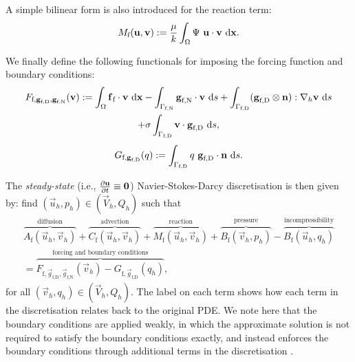             A simple bilinear form is also introduced for the reaction term:
            \begin{equation}
                M_\text{f}(\boldsymbol{\mathbf{u}}, \boldsymbol{\mathbf{v}}) := \frac{\mu}{k} \int_\Omega \Psi ~ \boldsymbol{\mathbf{u}} \cdot \boldsymbol{\mathbf{v}} ~\mathrm{d} \boldsymbol{\mathbf{x}}.
            \end{equation}
    
            We finally define the following functionals for imposing the forcing function and boundary conditions:
            \begin{multline}
                    F_{\text{f},\boldsymbol{\mathbf{g}}_\text{f,D}, \boldsymbol{\mathbf{g}}_\text{f,N}}(\boldsymbol{\mathbf{v}}) := \int_{\Omega} \boldsymbol{\mathbf{f}}_\text{f} \cdot \boldsymbol{\mathbf{v}} ~\mathrm{d}\boldsymbol{\mathbf{x}} - \int_{\Gamma_\text{f,N}} \boldsymbol{\mathbf{g}}_\text{f,N}  \cdot\boldsymbol{\mathbf{v}} ~\mathrm{d} s + \int_{\Gamma_\text{f,D}} (\boldsymbol{\mathbf{g}}_\text{f,D} \otimes \boldsymbol{\mathbf{n}}) : \nabla_h \boldsymbol{\mathbf{v}} ~\mathrm{d} s \\ + \sigma\int_{\Gamma_\text{f,D}} \boldsymbol{\mathbf{v}} \cdot \boldsymbol{\mathbf{g}}_\text{f,D} ~\mathrm{d} s,
            \end{multline}
            \begin{equation}
                    G_{\text{f},\boldsymbol{\mathbf{g}}_\text{f,D}}(q) := \int_{\Gamma_\text{f,D}} q ~ \boldsymbol{\mathbf{g}}_\text{f,D} \cdot \boldsymbol{\mathbf{n}} ~\mathrm{d} s.
            \end{equation}

            The \textit{steady-state} (i.e., $\pdv{\boldsymbol{\mathbf{u}}}{t} \equiv \boldsymbol{\mathbf{0}}$) Navier-Stokes-Darcy discretisation is then given by: find $(\vec{u}_h, p_h) \in (\vec{V}_h, Q_h)$ such that
            \begin{multline}
                \overbrace{A_\text{f}(\vec{u}_h, \vec{v}_h)}^{\text{diffusion}} + \overbrace{C_\text{f}(\vec{u}_h, \vec{v}_h)}^{\text{advection}} + \overbrace{M_\text{f}(\vec{u}_h, \vec{v}_h)}^{\text{reaction}} + \overbrace{B_\text{f}(\vec{v}_h, p_h)}^{\text{pressure}} - \overbrace{B_\text{f}(\vec{u}_h, q_h)}^{\text{incompressibility}} \\ = \overbrace{F_{\text{f},\vec{g}_\text{f,D},\vec{g}_\text{f,N}}(\vec{v}_h) - G_{\text{f},\vec{g}_\text{f,D}}(q_h)}^{\text{forcing and boundary conditions}},
                \label{eq:nsb-discretisation}
            \end{multline}
            for all $(\vec{v}_h, q_h) \in (\vec{V}_h, Q_h)$. The label on each term shows how each term in the discretisation relates back to the original PDE. We note here that the boundary conditions are applied weakly, in which the approximate solution is not required to satisfy the boundary conditions exactly, and instead enforces the boundary conditions through additional terms in the discretisation \cite{bazilevsWeakImpositionDirichlet2007}.

